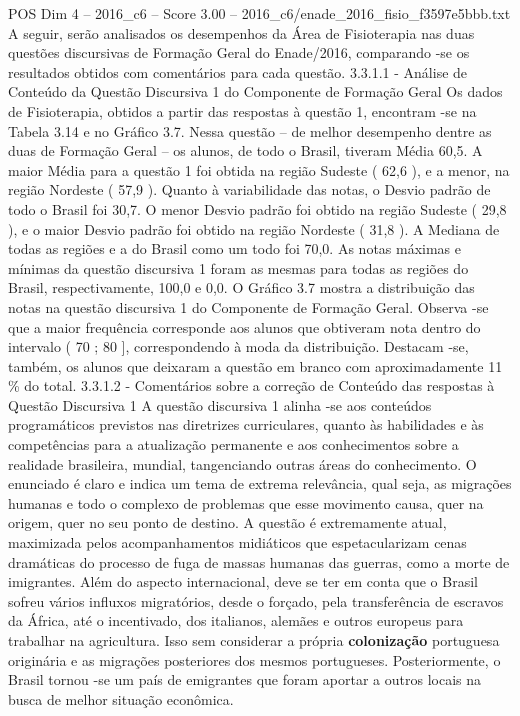 \begin{textsample}{POS Dim 4 – 2016\_c6 – Score 3.00 – 2016\_c6/enade\_2016\_fisio\_f3597e5bbb.txt}
A seguir, serão analisados os desempenhos da Área de Fisioterapia nas duas questões discursivas de Formação Geral do Enade/2016, comparando -se os resultados obtidos com comentários para cada questão. 3.3.1.1 - Análise de Conteúdo da Questão Discursiva 1 do Componente de Formação Geral Os dados de Fisioterapia, obtidos a partir das respostas à questão 1, encontram -se na Tabela 3.14 e no Gráfico 3.7.
Nessa questão – de melhor desempenho dentre as duas de Formação Geral – os alunos, de todo o Brasil, tiveram Média 60,5.
A maior Média para a questão 1 foi obtida na região Sudeste ( 62,6 ), e a menor, na região Nordeste ( 57,9 ).
Quanto à variabilidade das notas, o Desvio padrão de todo o Brasil foi 30,7.
O menor Desvio padrão foi obtido na região Sudeste ( 29,8 ), e o maior Desvio padrão foi obtido na região Nordeste ( 31,8 ).
A Mediana de todas as regiões e a do Brasil como um todo foi 70,0.
As notas máximas e mínimas da questão discursiva 1 foram as mesmas para todas as regiões do Brasil, respectivamente, 100,0 e 0,0.
O Gráfico 3.7 mostra a distribuição das notas na questão discursiva 1 do Componente de Formação Geral.
Observa -se que a maior frequência corresponde aos alunos que obtiveram nota dentro do intervalo ( 70 ; 80 ], correspondendo à moda da distribuição.
Destacam -se, também, os alunos que deixaram a questão em branco com aproximadamente 11 \% do total. 3.3.1.2 - Comentários sobre a correção de Conteúdo das respostas à Questão Discursiva 1 A questão discursiva 1 alinha -se aos conteúdos programáticos previstos nas diretrizes curriculares, quanto às habilidades e às competências para a atualização permanente e aos conhecimentos sobre a realidade brasileira, mundial, tangenciando outras áreas do conhecimento.
O enunciado é claro e indica um tema de extrema relevância, qual seja, as migrações humanas e todo o complexo de problemas que esse movimento causa, quer na origem, quer no seu ponto de destino.
A questão é extremamente atual, maximizada pelos acompanhamentos midiáticos que espetacularizam cenas dramáticas do processo de fuga de massas humanas das guerras, como a morte de imigrantes.
Além do aspecto internacional, deve se ter em conta que o Brasil sofreu vários influxos migratórios, desde o forçado, pela transferência de escravos da África, até o incentivado, dos italianos, alemães e outros europeus para trabalhar na agricultura.
Isso sem considerar a própria \textbf{colonização} portuguesa originária e as migrações posteriores dos mesmos portugueses.
Posteriormente, o Brasil tornou -se um país de emigrantes que foram aportar a outros locais na busca de melhor situação econômica.

\end{textsample}
